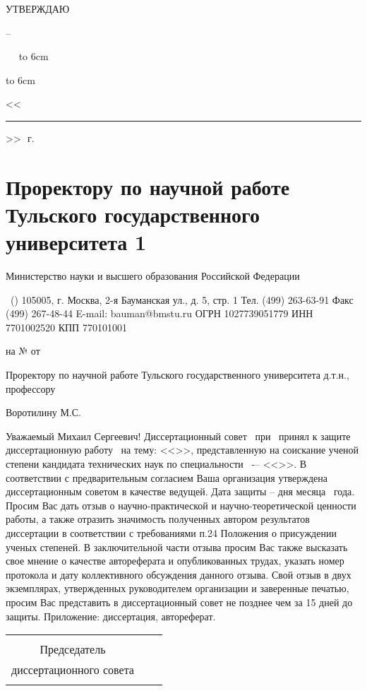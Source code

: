 
\hfill\parbox{6cm}{
	\centerline{УТВЕРЖДАЮ}
	\centerline{\leadingOrganizationHeadPos\---}
	\leadingOrganizationTitle
	
	\ktn~\leadingOrganizationHead\
	\linebreak
	{\hbox to 6cm{\hrulefill}}
	{\hbox to 6cm{<<\rule{7mm}{0.4pt}>>\hrulefill~\number\year\,г.}}}
\vspace{0.5cm}


\section{Проректору по научной работе Тульского государственного университета 1}





Министерство науки и высшего образования
Российской Федерации


\thesisOrganization\
(\thesisOrganizationShort)
105005, г. Москва, 2-я Бауманская ул., д. 5, стр. 1
Тел. (499) 263-63-91 Факс (499) 267-48-44
E-mail: bauman@bmstu.ru
ОГРН 1027739051779
ИНН 7701002520 КПП 770101001

на №	от	


Проректору по научной работе
Тульского государственного университета
д.т.н., профессору

Воротилину М.С.


Уважаемый Михаил Сергеевич!
Диссертационный совет \ при \thesisInOrganization\ принял к защите диссертационную работу \thesisAuthorLastNameFromFull\ на тему: <<\thesisTitle>>, представленную на соискание ученой степени кандидата технических наук по специальности \thesisSpecialtyNumber\ -– <<\thesisSpecialtyTitle>>.
В соответствии с предварительным согласием Ваша организация утверждена диссертационным советом в качестве ведущей.
Дата защиты – дня месяца \thesisYear\ года.
Просим Вас дать отзыв о научно-практической и научно-теоретической ценности работы, а также отразить значимость полученных автором результатов диссертации в соответствии с требованиями п.24 Положения о присуждении ученых степеней. В заключительной части отзыва просим Вас также высказать свое мнение о качестве автореферата и опубликованных трудах, указать номер протокола и дату коллективного обсуждения данного отзыва.
Свой отзыв в двух экземплярах, утвержденных руководителем организации и заверенные печатью, просим Вас представить в диссертационный совет не позднее чем за 15 дней до защиты.
Приложение: диссертация, автореферат.

\begin{center}
	\begin{tabular}[c]{c m{4cm} l}
		&            &                     \\
		Председатель       &            &                     \\
		диссертационного совета & \hrulefill & \dcHeadFullFIO      \\
		\dcHeadRegalia      &            &                     \\
	\end{tabular}
\end{center}
\clearpage